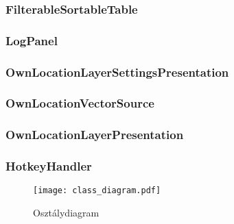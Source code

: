 \subsubsection{FilterableSortableTable}
\subsubsection{LogPanel}


\subsubsection{OwnLocationLayerSettingsPresentation}
\subsubsection{OwnLocationVectorSource}
\subsubsection{OwnLocationLayerPresentation}


\subsubsection{HotkeyHandler}


\begin{figure}[H]
  \centering
    \texttt{[image: class\_diagram.pdf]}
  \caption{Osztálydiagram}
\end{figure}
